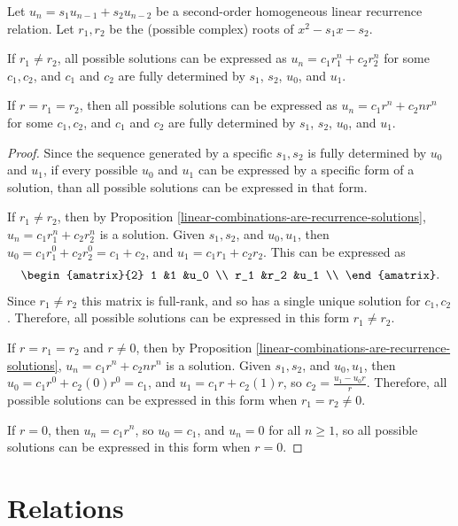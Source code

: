 \begin{thm}
    Let $u_n = s_1u_{n-1} + s_2u_{n-2}$ be a second-order homogeneous linear recurrence relation. Let $r_1, r_2$ be the (possible complex) roots of $x^2 - s_1x - s_2$.

    If $r_1 \neq r_2$, all possible solutions can be expressed as $u_n = c_1r_1^n + c_2r_2^n$  for some $c_1, c_2$, and $c_1$ and $c_2$ are fully determined by $s_1$, $s_2$, $u_0$, and $u_1$.

    If $r = r_1 = r_2$, then all possible solutions can be expressed as $u_n = c_1r^n + c_2nr^n$ for some $c_1, c_2$, and $c_1$ and $c_2$ are fully determined by $s_1$, $s_2$, $u_0$, and $u_1$.
\end{thm}

\begin{proof}
    Since the sequence generated by a specific $s_1, s_2$ is fully determined by $u_0$ and $u_1$, if every possible $u_0$ and $u_1$ can be expressed by a specific form of a solution, than all possible solutions can be expressed in that form.

    If $r_1 \neq r_2$, then by Proposition \ref{linear-combinations-are-recurrence-solutions}, $u_n = c_1r_1^n + c_2r_2^n$ is a solution. Given $s_1, s_2$, and $u_0, u_1$, then $u_0 = c_1r_1^0 + c_2r_2^0 = c_1 + c_2$, and $u_1 = c_1r_1 + c_2r_2$. This can be expressed as
    \[\begin{amatrix}{2}
        1 &1 &u_0 \\
        r_1 &r_2 &u_1 \\
    \end{amatrix}.\] Since $r_1 \neq r_2$ this matrix is full-rank, and so has a single unique solution for $c_1, c_2$. Therefore, all possible solutions can be expressed in this form $r_1 \neq r_2$.

    If $r = r_1 = r_2$ and $r \neq 0$, then by Proposition \ref{linear-combinations-are-recurrence-solutions}, $u_n = c_1r^n + c_2nr^n$ is a solution. Given $s_1, s_2$, and $u_0, u_1$, then $u_0 = c_1r^0 + c_2(0)r^0 = c_1$, and $u_1 = c_1r + c_2(1)r$, so $c_2 = \frac{u_1 - u_0r}{r}$. Therefore, all possible solutions can be expressed in this form when $r_1 = r_2 \neq 0$.

    If $r = 0$, then $u_n = c_1r^n$, so $u_0 = c_1$, and $u_n = 0$ for all $n \geq 1$, so all possible solutions can be expressed in this form when $r = 0$.
\end{proof}

\section{Relations}

